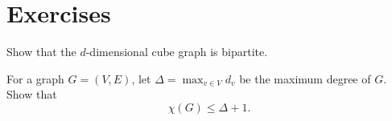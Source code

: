 \documentclass[nobib]{tufte-handout}
\begin{document}
\section{Exercises}

\begin{xca}
    Show that the $d$-dimensional cube graph is bipartite.
\end{xca}

\begin{xca}
    For a graph $G = (V,E)$, let $\Delta = \max_{v \in V} d_v$ be the maximum degree of $G$. Show that
    $$\chi(G) \leq \Delta + 1.$$
\end{xca}


%
%
\end{document}

